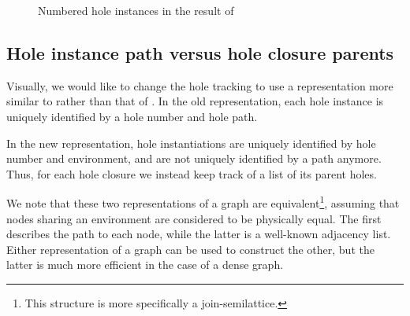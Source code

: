 \begin{figure}
  \centering
  \caption{Numbered hole instances in the result of }
  \label{fig:hole-renumbered-result}
\end{figure}

\subsection{Hole instance path versus hole closure parents}
\label{sec:closure-parents}

Visually, we would like to change the hole tracking to use a representation more similar to  rather than that of . In the old representation, each hole instance is uniquely identified by a hole number and hole path.

In the new representation, hole instantiations are uniquely identified by hole number and environment, and are not uniquely identified by a path anymore. Thus, for each hole closure we instead keep track of a list of its parent holes.

We note that these two representations of a graph are equivalent\footnote{This structure is more specifically a join-semilattice.}, assuming that nodes sharing an environment are considered to be physically equal. The first describes the path to each node, while the latter is a well-known adjacency list. Either representation of a graph can be used to construct the other, but the latter is much more efficient in the case of a dense graph.


